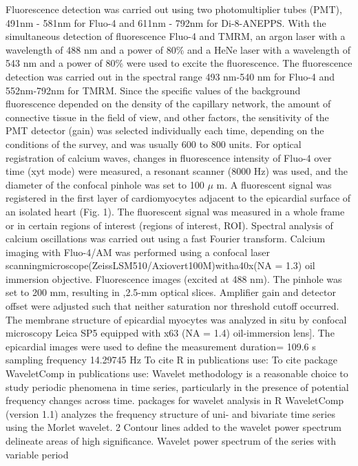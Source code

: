 \documentclass[a4paper,12pt]{article}
\begin{document}
Fluorescence detection was carried out using two photomultiplier tubes (PMT), 491nm - 581nm for Fluo-4 and 611nm - 792nm for Di-8-ANEPPS.
With the simultaneous detection of fluorescence Fluo-4 and TMRM, an argon laser with a wavelength of 488 nm and a power of 80\% and a HeNe laser with a wavelength of 543 nm and a power of 80\% were used to excite the fluorescence.
The fluorescence detection was carried out in the spectral range 493 nm-540 nm for Fluo-4 and 552nm-792nm for TMRM.
Since the specific values of the background fluorescence depended on the density of the capillary network, the amount of connective tissue in the field of view, and other factors, the sensitivity of the PMT detector (gain) was selected individually each time, depending on the conditions of the survey, and was usually 600 to 800 units.
For optical registration of calcium waves, changes in fluorescence intensity of Fluo-4 over time (xyt mode) were measured, a resonant scanner (8000 Hz) was used, and the diameter of the confocal pinhole was set to 100 $\mu$ m.
A fluorescent signal was registered in the first layer of cardiomyocytes adjacent to the epicardial surface of an isolated heart (Fig. 1). The fluorescent signal was measured in a whole frame or in certain regions of interest (regions of interest, ROI).
Spectral analysis of calcium oscillations was carried out using a fast Fourier transform.
Calcium imaging with Fluo-4/AM was performed using a confocal laser scanningmicroscope(ZeissLSM510/Axiovert100M)witha40x(NA = 1.3) oil immersion objective. Fluorescence images (excited at 488 nm).
The pinhole was set to 200 mm, resulting in ,2.5-mm optical slices. Amplifier gain and detector offset were adjusted such that neither saturation nor threshold cutoff occurred.
The membrane structure of epicardial myocytes was analyzed in situ by confocal microscopy Leica SP5 equipped with x63 (NA = 1.4) oil-immersion lens]. The epicardial images were used to define the
measurement duration= 109.6 s
sampling frequency 14.29745 Hz
To cite R in publications use:  \cite{team2014r}
To cite package WaveletComp in publications use: \cite{roesch2014waveletcomp}
Wavelet methodology is a reasonable choice to study periodic phenomena in time series, particularly in
the presence of potential frequency changes across time.
packages for wavelet analysis in R
WaveletComp (version 1.1) analyzes the frequency structure of uni- and bivariate time series using the Morlet wavelet. 2
Contour lines added to the wavelet power spectrum delineate areas of high significance.
Wavelet power spectrum of the series with variable period
\end{document}
